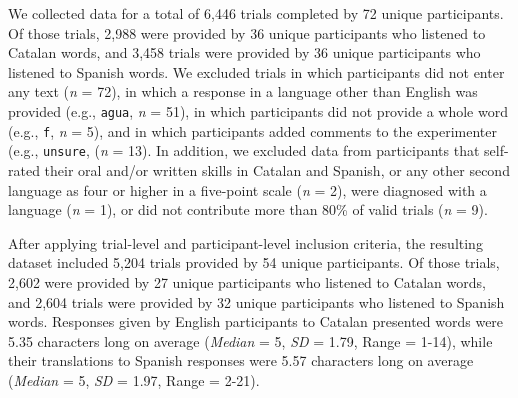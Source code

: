 \documentclass[
]{article}
\begin{document}
We collected data for a total of 6,446 trials completed by 72 unique
participants. Of those trials, 2,988 were provided by 36 unique
participants who listened to Catalan words, and 3,458 trials were
provided by 36 unique participants who listened to Spanish words. We
excluded trials in which participants did not enter any text (\emph{n} =
72), in which a response in a language other than English was provided
(e.g., \texttt{agua}, \emph{n} = 51), in which participants did not
provide a whole word (e.g., \texttt{f}, \emph{n} = 5), and in which
participants added comments to the experimenter (e.g., \texttt{unsure},
(\emph{n} = 13). In addition, we excluded data from participants that
self-rated their oral and/or written skills in Catalan and Spanish, or
any other second language as four or higher in a five-point scale
(\emph{n} = 2), were diagnosed with a language (\emph{n} = 1), or did
not contribute more than 80\% of valid trials (\emph{n} = 9).

After applying trial-level and participant-level inclusion criteria, the
resulting dataset included 5,204 trials provided by 54 unique
participants. Of those trials, 2,602 were provided by 27 unique
participants who listened to Catalan words, and 2,604 trials were
provided by 32 unique participants who listened to Spanish words.
Responses given by English participants to Catalan presented words were
5.35 characters long on average (\emph{Median} = 5, \emph{SD} = 1.79,
Range = 1-14), while their translations to Spanish responses were 5.57
characters long on average (\emph{Median} = 5, \emph{SD} = 1.97, Range =
2-21).

\captionsetup{labelsep=none}
\end{document}
